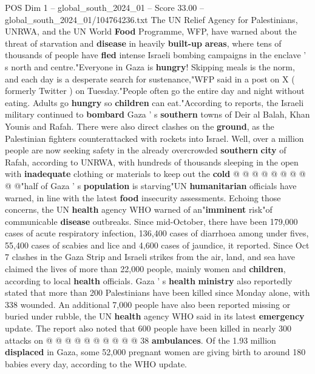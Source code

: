 \begin{textsample}{POS Dim 1 – global\_south\_2024\_01 – Score 33.00 – global\_south\_2024\_01/104764236.txt}  \label{ex:f1_pos_120}
The UN Relief Agency for Palestinians, UNRWA, and the UN World \textbf{Food} Programme, WFP, have warned about the threat of starvation and \textbf{disease} in heavily \textbf{built-up} \textbf{areas}, where tens of thousands of people have \textbf{fled} intense Israeli bombing campaigns in the enclave ' s north and centre."Everyone in Gaza is \textbf{hungry}!
Skipping meals is the norm, and each day is a desperate search for sustenance,"WFP said in a post on X ( formerly Twitter ) on Tuesday."People often go the entire day and night without eating.
Adults go \textbf{hungry} so \textbf{children} can eat."According to reports, the Israeli military continued to \textbf{bombard} Gaza ' s \textbf{southern} towns of Deir al Balah, Khan Younis and Rafah.
There were also direct clashes on the \textbf{ground}, as the Palestinian fighters counterattacked with rockets into Israel.
Well, over a million people are now seeking safety in the already overcrowded \textbf{southern} \textbf{city} of Rafah, according to UNRWA, with hundreds of thousands sleeping in the open with \textbf{inadequate} clothing or materials to keep out the \textbf{cold} @ @ @ @ @ @ @ @ @ @"half of Gaza ' s \textbf{population} is starving"UN \textbf{humanitarian} officials have warned, in line with the latest \textbf{food} insecurity assessments.
Echoing those concerns, the UN \textbf{health} agency WHO warned of an"\textbf{imminent} risk"of communicable \textbf{disease} outbreaks.
Since mid-October, there have been 179,000 cases of acute respiratory infection, 136,400 cases of diarrhoea among under fives, 55,400 cases of scabies and lice and 4,600 cases of jaundice, it reported.
Since Oct 7 clashes in the Gaza Strip and Israeli strikes from the air, land, and sea have claimed the lives of more than 22,000 people, mainly women and \textbf{children}, according to local \textbf{health} officials.
Gaza ' s \textbf{health} \textbf{ministry} also reportedly stated that more than 200 Palestinians have been killed since Monday alone, with 338 wounded.
An additional 7,000 people have also been reported missing or buried under rubble, the UN \textbf{health} agency WHO said in its latest \textbf{emergency} update.
The report also noted that 600 people have been killed in nearly 300 attacks on @ @ @ @ @ @ @ @ @ @ 38 \textbf{ambulances}.
Of the 1.93 million \textbf{displaced} in Gaza, some 52,000 pregnant women are giving birth to around 180 babies every day, according to the WHO update.

\end{textsample}
